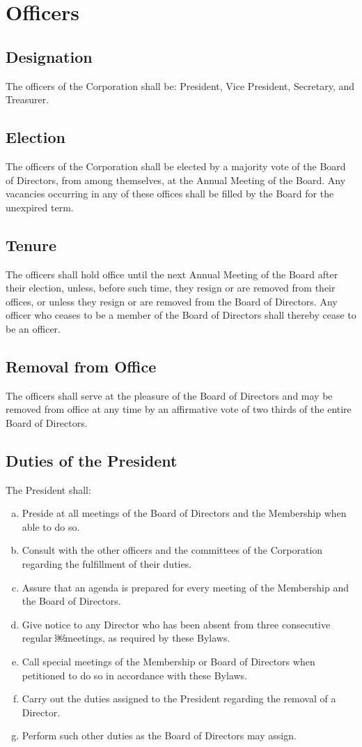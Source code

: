 \section{Officers}

\subsection{Designation}
The officers of the Corporation shall be: President, Vice President,
Secretary, and Treasurer.

\subsection{Election}
The officers of the Corporation shall be elected by a majority vote of
the Board of Directors, from among themselves, at the Annual Meeting
of the Board. Any vacancies occurring in any of these offices shall be
filled by the Board for the unexpired term.

\subsection{Tenure}
The officers shall hold office until the next Annual Meeting of the
Board after their election, unless, before such time, they resign or
are removed from their offices, or unless they resign or are removed
from the Board of Directors. Any officer who ceases to be a member of
the Board of Directors shall thereby cease to be an officer.


\subsection{Removal from Office}
The officers shall serve at the pleasure of the Board of Directors and
may be removed from office at any time by an affirmative vote of two
thirds of the entire Board of Directors.

\subsection{Duties of the President}
The President shall:
\begin{enumerate}[a.]
\item Preside at all meetings of the Board of Directors and the
  Membership when able to do so.
\item Consult with the other officers and the committees of the
  Corporation regarding the fulfillment of their duties.
\item Assure that an agenda is prepared for every meeting of the
  Membership and the Board of Directors.
\item Give notice to any Director who has been absent from three
  consecutive regular ￼meetings, as required by these Bylaws.
\item Call special meetings of the Membership or Board of Directors
  when petitioned to do so in accordance with these Bylaws.
\item Carry out the duties assigned to the President regarding the
  removal of a Director.
\item Perform such other duties as the Board of Directors may assign.
\end{enumerate}

